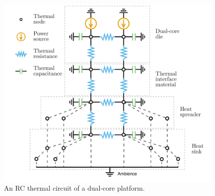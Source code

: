 \begin{figure}[t]
  \centering
  \includegraphics[width=\linewidth]{include/assets/circuit.pdf}
  \vspace{-1.0em}
  \caption{An RC thermal circuit of a dual-core platform.}
  \vspace{-1.5em}
\end{figure}
